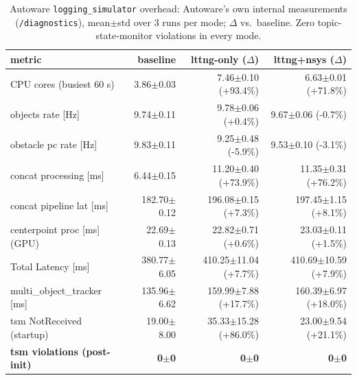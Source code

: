 \begin{table}[t]\centering\small
\caption{Autoware \texttt{logging\_simulator} overhead: Autoware's own internal measurements (\texttt{/diagnostics}), mean$\pm$std over 3 runs per mode; $\Delta$ vs.\ baseline. Zero topic-state-monitor violations in every mode.}\label{tab:aw-overhead}
\begin{tabular}{lrrr}
\toprule
metric & baseline & lttng-only ($\Delta$) & lttng+nsys ($\Delta$) \\
\midrule
CPU cores (busiest 60 s) & 3.86$\pm$0.03 & 7.46$\pm$0.10 (+93.4\%) & 6.63$\pm$0.01 (+71.8\%) \\
objects rate [Hz] & 9.74$\pm$0.11 & 9.78$\pm$0.06 (+0.4\%) & 9.67$\pm$0.06 (-0.7\%) \\
obstacle pc rate [Hz] & 9.83$\pm$0.11 & 9.25$\pm$0.48 (-5.9\%) & 9.53$\pm$0.10 (-3.1\%) \\
concat processing [ms] & 6.44$\pm$0.15 & 11.20$\pm$0.40 (+73.9\%) & 11.35$\pm$0.31 (+76.2\%) \\
concat pipeline lat [ms] & 182.70$\pm$0.12 & 196.08$\pm$0.15 (+7.3\%) & 197.45$\pm$1.15 (+8.1\%) \\
centerpoint proc [ms] (GPU) & 22.69$\pm$0.13 & 22.82$\pm$0.71 (+0.6\%) & 23.03$\pm$0.11 (+1.5\%) \\
Total Latency [ms] & 380.77$\pm$6.05 & 410.25$\pm$11.04 (+7.7\%) & 410.69$\pm$10.59 (+7.9\%) \\
multi\_object\_tracker [ms] & 135.96$\pm$6.62 & 159.99$\pm$7.88 (+17.7\%) & 160.39$\pm$6.97 (+18.0\%) \\
\midrule
tsm NotReceived (startup) & 19.00$\pm$8.00 & 35.33$\pm$15.28 (+86.0\%) & 23.00$\pm$9.54 (+21.1\%) \\
\midrule
\textbf{tsm violations (post-init)} & \textbf{0$\pm$0} & \textbf{0$\pm$0} & \textbf{0$\pm$0} \\
\bottomrule
\end{tabular}
\end{table}
